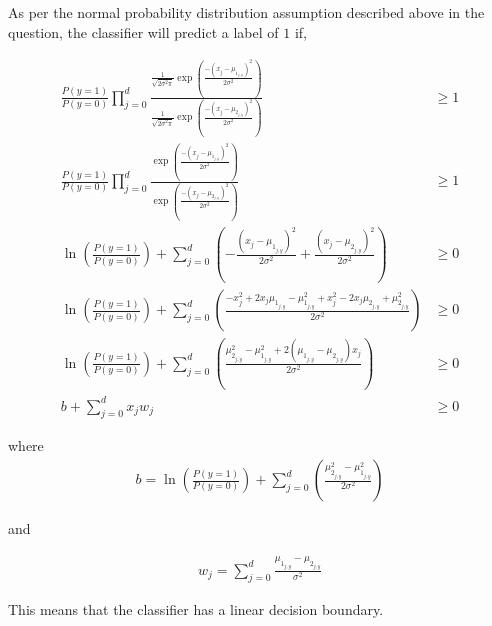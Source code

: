 As per the normal probability distribution assumption described above in the question, the classifier will predict a label of $1$ if,

\begin{equation*}
\begin{aligned}
\frac{P(y=1)}{P(y=0)} \displaystyle \prod_{j=0}^{d}  \frac{ \frac{1}{\sqrt{2 \sigma^2 \pi}} \exp\left(\frac{-\left(x_j - \mu_{1_{j,y}}\right)^2}{2\sigma^2}\right)}{   \frac{1}{\sqrt{2 \sigma^2 \pi}} \exp\left(\frac{-\left(x_j - \mu_{2_{j,y}}\right)^2}{2\sigma^2}\right)} &\geq 1\\
\frac{P(y=1)}{P(y=0)} \displaystyle \prod_{j=0}^{d} \frac{\exp\left(\frac{-\left(x_j - \mu_{1_{j,y}}\right)^2}{2\sigma^2}\right)}{\exp\left(\frac{-\left(x_j - \mu_{2_{j,y}}\right)^2}{2\sigma^2}\right)} &\geq 1\\
\ln \left( \frac{P(y=1)}{P(y=0)}\right) + \displaystyle \sum_{j=0}^{d} \left(  - \frac{\left( x_j - \mu_{1_{j,y}} \right)^2}{2\sigma^2} + \frac{\left( x_j - \mu_{2_{j,y}} \right)^2}{2\sigma^2} \right) &\geq 0\\
\ln \left( \frac{P(y=1)}{P(y=0)}\right) + \displaystyle \sum_{j=0}^{d} \left(  \frac{-x_j^2 + 2x_j\mu_{1_{j,y}} - \mu_{1_{j,y}}^2 + x_j^2 - 2x_j\mu_{2_{j,y}} + \mu_{2_{j,y}}^2 }{2\sigma^2} \right) &\geq 0\\
\ln \left( \frac{P(y=1)}{P(y=0)}\right) + \displaystyle \sum_{j=0}^{d} \left(  \frac{\mu_{2_{j,y}}^2  - \mu_{1_{j,y}}^2 + 2(\mu_{1_{j,y}} - \mu_{2_{j,y}})x_j  }{2\sigma^2} \right) &\geq 0\\
b + \displaystyle \sum_{j=0}^{d} x_j w_j &\geq 0
\end{aligned}
\end{equation*}

where 
\begin{equation*}
\begin{aligned}
b=\ln \left( \frac{P(y=1)}{P(y=0)}\right) + \displaystyle \sum_{j=0}^{d} \left(  \frac{\mu_{2_{j,y}}^2  - \mu_{1_{j,y}}^2 }{2\sigma^2} \right) 
\end{aligned}
\end{equation*}

and

\begin{equation*}
\begin{aligned}
w_j = \displaystyle \sum_{j=0}^{d} \frac{\mu_{1_{j,y}} - \mu_{2_{j,y}}}{\sigma^2}
\end{aligned}
\end{equation*}

This means that the classifier has a linear decision boundary.
